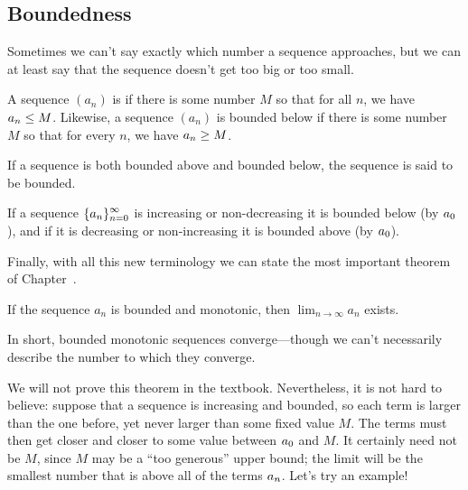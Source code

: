 \subsection{Boundedness}
\label{subsection:boundedness}

Sometimes we can't say exactly which number a sequence approaches, but
we can at least say that the sequence doesn't get too big or too
small.

\begin{definition}
  A sequence $(a_n)$ is  if there is some number
$M$ so that for all $n$, we have $\displaystyle a_n\le M$.  Likewise, a sequence
$(a_n)$ is {\dfont bounded below\/} if
there is some number $M$ so that for every $n$, we have $\displaystyle a_n\ge M$.

If a sequence is both bounded above and bounded below, the sequence is said
to be {\dfont bounded\/}.
\end{definition}

If a sequence $\displaystyle
\{a_n\}_{n=0}^\infty$ is increasing or non-decreasing it is bounded
below (by $\displaystyle a_0$), and if it is decreasing or non-increasing it is
bounded above (by $\displaystyle a_0$).

Finally, with all this new terminology we can state the most important
theorem of Chapter~.

\begin{theorem} If the sequence $a_n$ is bounded and monotonic, then
  $\lim_{n \to \infty} a_n$ exists.  \label{thm:bounded-monotonic}
\end{theorem}
In short, bounded monotonic sequences converge---though we can't
necessarily describe the number to which they converge.

We will not prove this theorem in the textbook. Nevertheless,
it is not hard to believe: suppose that a sequence is increasing and
bounded, so each term is larger than the one before, yet never larger
than some fixed value $M$. The terms must then get closer and closer
to some value between $\displaystyle a_0$ and $M$. It certainly need not be $M$,
since $M$ may be a ``too generous'' upper bound; the limit will be the
smallest number that is above all of the terms
$\displaystyle a_n$.  Let's try an example!

